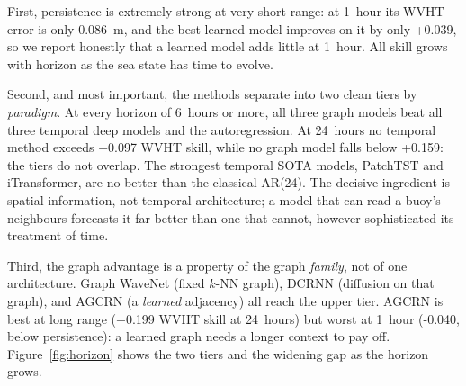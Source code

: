 \documentclass[11pt]{article}
\begin{document}
First, persistence is extremely strong at very short range: at 1~hour its WVHT
error is only 0.086~m, and the best learned model improves on it by only
+0.039, so we report honestly that a learned model adds little at 1~hour. All
skill grows with horizon as the sea state has time to evolve.

Second, and most important, the methods separate into two clean tiers by
\emph{paradigm}. At every horizon of 6~hours or more, all three graph models beat
all three temporal deep models and the autoregression. At 24~hours no temporal
method exceeds +0.097 WVHT skill, while no graph model falls below
+0.159: the tiers do not overlap. The strongest temporal SOTA models,
PatchTST and iTransformer, are no better than the classical AR(24). The decisive
ingredient is spatial information, not temporal architecture; a model that can read
a buoy's neighbours forecasts it far better than one that cannot, however
sophisticated its treatment of time.

Third, the graph advantage is a property of the graph \emph{family}, not of one
architecture. Graph WaveNet (fixed $k$-NN graph), DCRNN (diffusion on that graph),
and AGCRN (a \emph{learned} adjacency) all reach the upper tier. AGCRN is best at
long range (+0.199 WVHT skill at 24~hours) but worst at 1~hour (-0.040,
below persistence): a learned graph needs a longer context to pay off.
Figure~\ref{fig:horizon} shows the two tiers and the widening gap as the horizon
grows.
\end{document}
